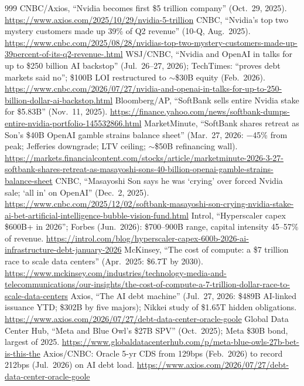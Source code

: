 \begin{thebibliography}{999}
 CNBC/Axios, ``Nvidia becomes first \$5 trillion company'' (Oct.\ 29, 2025). \url{https://www.axios.com/2025/10/29/nvidia-5-trillion}
 CNBC, ``Nvidia's top two mystery customers made up 39\% of Q2 revenue'' (10-Q, Aug.\ 2025). \url{https://www.cnbc.com/2025/08/28/nvidias-top-two-mystery-customers-made-up-39percent-of-its-q2-revenue-.html}
 WSJ/CNBC, ``Nvidia and OpenAI in talks for up to \$250 billion AI backstop'' (Jul.\ 26--27, 2026); TechTimes: ``proves debt markets said no''; \$100B LOI restructured to $\sim$\$30B equity (Feb.\ 2026). \url{https://www.cnbc.com/2026/07/27/nvidia-and-openai-in-talks-for-up-to-250-billion-dollar-ai-backstop.html}
 Bloomberg/AP, ``SoftBank sells entire Nvidia stake for \$5.83B'' (Nov.\ 11, 2025). \url{https://finance.yahoo.com/news/softbank-dumps-entire-nvidia-portfolio-145532866.html}
 MarketMinute, ``SoftBank shares retreat as Son's \$40B OpenAI gamble strains balance sheet'' (Mar.\ 27, 2026: $-$45\% from peak; Jefferies downgrade; LTV ceiling; $\sim$\$50B refinancing wall). \url{https://markets.financialcontent.com/stocks/article/marketminute-2026-3-27-softbank-shares-retreat-as-masayoshi-sons-40-billion-openai-gamble-strains-balance-sheet}
 CNBC, ``Masayoshi Son says he was `crying' over forced Nvidia sale; `all in' on OpenAI'' (Dec.\ 2, 2025). \url{https://www.cnbc.com/2025/12/02/softbank-masayoshi-son-crying-nvidia-stake-ai-bet-artificial-intelligence-bubble-vision-fund.html}
 Introl, ``Hyperscaler capex \$600B+ in 2026''; Forbes (Jun.\ 2026): \$700--900B range, capital intensity 45--57\% of revenue. \url{https://introl.com/blog/hyperscaler-capex-600b-2026-ai-infrastructure-debt-january-2026}
 McKinsey, ``The cost of compute: a \$7 trillion race to scale data centers'' (Apr.\ 2025: \$6.7T by 2030). \url{https://www.mckinsey.com/industries/technology-media-and-telecommunications/our-insights/the-cost-of-compute-a-7-trillion-dollar-race-to-scale-data-centers}
 Axios, ``The AI debt machine'' (Jul.\ 27, 2026: \$489B AI-linked issuance YTD; \$302B by five majors); Nikkei study of \$1.65T hidden obligations. \url{https://www.axios.com/2026/07/27/debt-data-center-oracle-goole}
 Global Data Center Hub, ``Meta and Blue Owl's \$27B SPV'' (Oct.\ 2025); Meta \$30B bond, largest of 2025. \url{https://www.globaldatacenterhub.com/p/meta-blue-owls-27b-bet-is-this-the}
 Axios/CNBC: Oracle 5-yr CDS from 129bps (Feb.\ 2026) to record 212bps (Jul.\ 2026) on AI debt load. \url{https://www.axios.com/2026/07/27/debt-data-center-oracle-goole}

\end{thebibliography}
